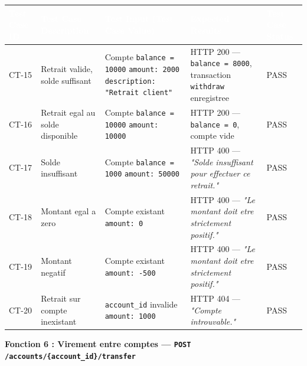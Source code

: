 \documentclass[12pt,a4paper]{article}
\begin{document}
\begin{longtable}{|L{1.6cm}|L{3.8cm}|L{5.2cm}|L{4.2cm}|L{1.8cm}|}
\hline
{}
\textbf{\textcolor{white}{Test Case ID}} & \textbf{\textcolor{white}{Test Case Description}} & \textbf{\textcolor{white}{Test Input (Test Case Value)}} & \textbf{\textcolor{white}{Expected Results}} & \textbf{\textcolor{white}{Test Case Status}} \\
\hline
CT-15 & Retrait valide, solde suffisant & Compte \texttt{balance = 10000} \newline \texttt{amount: 2000} \newline \texttt{description: "Retrait client"} & HTTP 200 --- \texttt{balance = 8000}, transaction \texttt{withdraw} enregistree & PASS \\
\hline
{}
CT-16 & Retrait egal au solde disponible & Compte \texttt{balance = 10000} \newline \texttt{amount: 10000} & HTTP 200 --- \texttt{balance = 0}, compte vide & PASS \\
\hline
CT-17 & Solde insuffisant & Compte \texttt{balance = 1000} \newline \texttt{amount: 50000} & HTTP 400 --- \textit{"Solde insuffisant pour effectuer ce retrait."} & PASS \\
\hline
{}
CT-18 & Montant egal a zero & Compte existant \newline \texttt{amount: 0} & HTTP 400 --- \textit{"Le montant doit etre strictement positif."} & PASS \\
\hline
CT-19 & Montant negatif & Compte existant \newline \texttt{amount: -500} & HTTP 400 --- \textit{"Le montant doit etre strictement positif."} & PASS \\
\hline
{}
CT-20 & Retrait sur compte inexistant & \texttt{account\_id} invalide \newline \texttt{amount: 1000} & HTTP 404 --- \textit{"Compte introuvable."} & PASS \\
\hline
\end{longtable}

\vspace{0.2cm}
{\bfseries\textcolor{danger}{Fonction 6 : Virement entre comptes --- \texttt{POST /accounts/\{account\_id\}/transfer}}}
\vspace{0.1cm}
\end{document}

